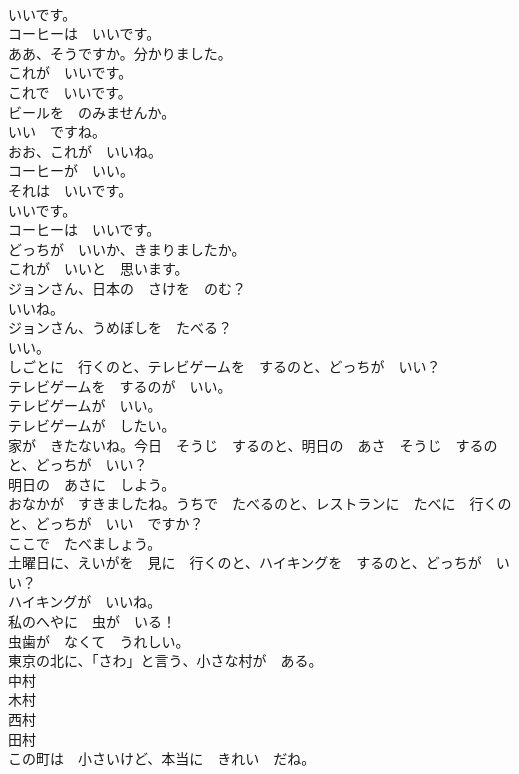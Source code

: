 \documentclass[8pt]{extreport}
\begin{document}
\begin{CJK}{UTF8}{min}
\\	いいです。	
\\	コーヒーは　いいです。	
\\	ああ、そうですか。分かりました。	
\\	これが　いいです。	
\\	これで　いいです。	
\\	ビールを　のみませんか。	
\\	いい　ですね。	
\\	おお、これが　いいね。	
\\	コーヒーが　いい。	
\\	それは　いいです。	
\\	いいです。	
\\	コーヒーは　いいです。	
\\	どっちが　いいか、きまりましたか。	
\\	これが　いいと　思います。	
\\	ジョンさん、日本の　さけを　のむ？	
\\	いいね。	
\\	ジョンさん、うめぼしを　たべる？	
\\	いい。	
\\	しごとに　行くのと、テレビゲームを　するのと、どっちが　いい？	
\\	テレビゲームを　するのが　いい。	
\\	テレビゲームが　いい。	
\\	テレビゲームが　したい。	
\\	家が　きたないね。今日　そうじ　するのと、明日の　あさ　そうじ　するのと、どっちが　いい？	
\\	明日の　あさに　しよう。	
\\	おなかが　すきましたね。うちで　たべるのと、レストランに　たべに　行くのと、どっちが　いい　ですか？	
\\	ここで　たべましょう。	
\\	土曜日に、えいがを　見に　行くのと、ハイキングを　するのと、どっちが　いい？	
\\	ハイキングが　いいね。	
\\	私のへやに　虫が　いる！	
\\	虫歯が　なくて　うれしい。	
\\	東京の北に、「さわ」と言う、小さな村が　ある。	
\\	中村	
\\	木村	
\\	西村	
\\	田村	
\\	この町は　小さいけど、本当に　きれい　だね。	

\end{CJK}
\end{document}
